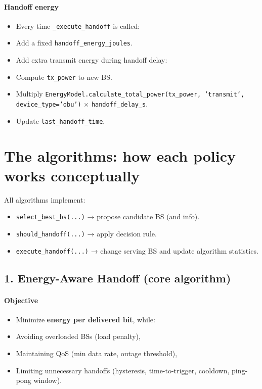 \documentclass[conference]{IEEEtran}
\begin{document}
\paragraph*{Handoff energy}
\begin{itemize}
\item Every time \texttt{\_execute\_handoff} is called:
\item Add a fixed \texttt{handoff\_energy\_joules}.
\item Add extra transmit energy during handoff delay:
\item Compute \texttt{tx\_power} to new BS.
\item Multiply \texttt{EnergyModel.calculate\_total\_power(tx\_power, 'transmit', device\_type='obu')} × \texttt{handoff\_delay\_s}.
\item Update \texttt{last\_handoff\_time}.
\end{itemize}



\section{The algorithms: how each policy works conceptually}

All algorithms implement:
\begin{itemize}
\item \texttt{select\_best\_bs(...)} → propose candidate BS (and info).
\item \texttt{should\_handoff(...)} → apply decision rule.
\item \texttt{execute\_handoff(...)} → change serving BS and update algorithm statistics.
\end{itemize}


\subsection{1. Energy-Aware Handoff (core algorithm)}

\paragraph*{Objective}
\begin{itemize}
\item Minimize \textbf{energy per delivered bit}, while:
\item Avoiding overloaded BSs (load penalty),
\item Maintaining QoS (min data rate, outage threshold),
\item Limiting unnecessary handoffs (hysteresis, time-to-trigger, cooldown, ping-pong window).
\end{itemize}
\end{document}
